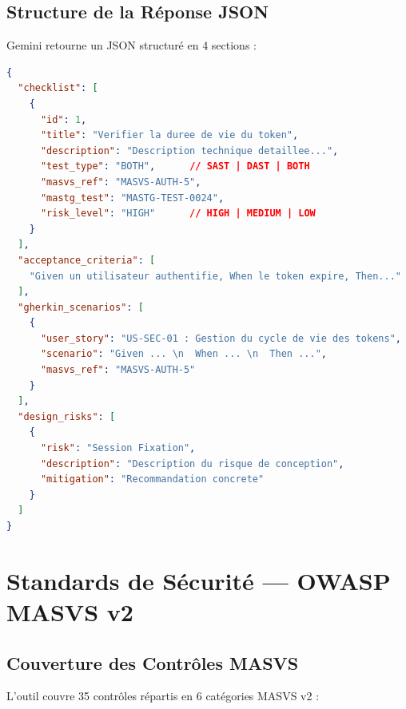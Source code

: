 \documentclass[12pt,a4paper,french]{article}
\begin{document}
\subsection{Structure de la Réponse JSON}

Gemini retourne un JSON structuré en 4 sections :

\begin{lstlisting}[language=json, caption={Structure du JSON retourné par Gemini}]
{
  "checklist": [
    {
      "id": 1,
      "title": "Verifier la duree de vie du token",
      "description": "Description technique detaillee...",
      "test_type": "BOTH",      // SAST | DAST | BOTH
      "masvs_ref": "MASVS-AUTH-5",
      "mastg_test": "MASTG-TEST-0024",
      "risk_level": "HIGH"      // HIGH | MEDIUM | LOW
    }
  ],
  "acceptance_criteria": [
    "Given un utilisateur authentifie, When le token expire, Then..."
  ],
  "gherkin_scenarios": [
    {
      "user_story": "US-SEC-01 : Gestion du cycle de vie des tokens",
      "scenario": "Given ... \n  When ... \n  Then ...",
      "masvs_ref": "MASVS-AUTH-5"
    }
  ],
  "design_risks": [
    {
      "risk": "Session Fixation",
      "description": "Description du risque de conception",
      "mitigation": "Recommandation concrete"
    }
  ]
}
\end{lstlisting}

\section{Standards de Sécurité — OWASP MASVS v2}

\subsection{Couverture des Contrôles MASVS}

L'outil couvre 35 contrôles répartis en 6 catégories MASVS v2 :

\begin{center}
\end{center}
\end{document}
